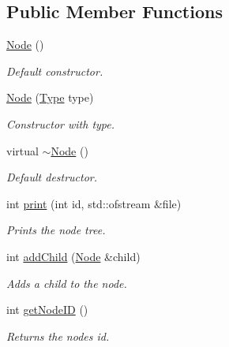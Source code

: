 \subsection*{Public Member Functions}
\begin{DoxyCompactItemize}
\item 
\hypertarget{classNode_ad7a34779cad45d997bfd6d3d8043c75f}{}\hyperlink{classNode_ad7a34779cad45d997bfd6d3d8043c75f}{Node} ()\label{classNode_ad7a34779cad45d997bfd6d3d8043c75f}

\begin{DoxyCompactList}\small\item\em Default constructor. \end{DoxyCompactList}\item 
\hyperlink{classNode_a4122dca231612c6fd2eb17fd92a02892}{Node} (\hyperlink{classNode_a8dad370be1595f49e0a7c2406a91e867}{Type} type)
\begin{DoxyCompactList}\small\item\em Constructor with type. \end{DoxyCompactList}\item 
\hypertarget{classNode_aa0840c3cb5c7159be6d992adecd2097c}{}virtual \hyperlink{classNode_aa0840c3cb5c7159be6d992adecd2097c}{$\sim$\+Node} ()\label{classNode_aa0840c3cb5c7159be6d992adecd2097c}

\begin{DoxyCompactList}\small\item\em Default destructor. \end{DoxyCompactList}\item 
int \hyperlink{classNode_a6da281a118324b234071c80a554500cf}{print} (int id, std\+::ofstream \&file)
\begin{DoxyCompactList}\small\item\em Prints the node tree. \end{DoxyCompactList}\item 
int \hyperlink{classNode_a9b0be5aa8a91b5b9b99968bc835475c4}{add\+Child} (\hyperlink{classNode}{Node} \&child)
\begin{DoxyCompactList}\small\item\em Adds a child to the node. \end{DoxyCompactList}\item 
int \hyperlink{classNode_a374c18bf6d7332e4a128107b8446d1ad}{get\+Node\+I\+D} ()
\begin{DoxyCompactList}\small\item\em Returns the nodes id. \end{DoxyCompactList}\end{DoxyCompactItemize}


